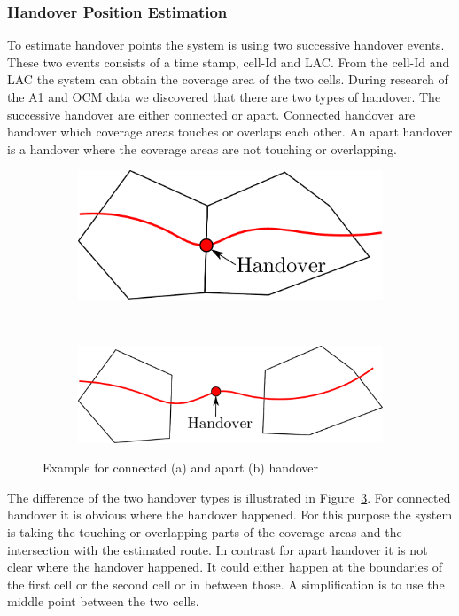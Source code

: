 \subsubsection{Handover Position Estimation}
To estimate handover points the system is using two successive handover events. These two events consists of a time stamp, cell-Id and LAC. From the cell-Id and LAC the system can obtain the coverage area of the two cells. During research of the A1 and OCM data we discovered that there are two types of handover. The successive handover are either connected or apart. Connected handover are handover which coverage areas touches or overlaps each other. An apart handover is a handover where the coverage areas are not touching or overlapping.
\begin{figure}
	\centering
	\begin{subfigure}[b]{0.4\textwidth}
		\includegraphics[width=\textwidth]{./images/handover_together}
		\caption{}
		\label{fig:handovertogether}
	\end{subfigure}%
	~ %
	\begin{subfigure}[b]{0.55\textwidth}
		\includegraphics[width=\textwidth]{./images/handover_apart}
		\caption{}
		\label{fig:handoverapart}
	\end{subfigure}

	\caption{Example for connected (a) and apart (b) handover}
	\label{fig:handovertypes}
\end{figure}
The difference of the two handover types is illustrated in Figure~\ref{fig:handovertypes}. For connected handover it is obvious where the handover happened. For this purpose the system is taking the touching or overlapping parts of the coverage areas and the intersection with the estimated route. In contrast for apart handover it is not clear where the handover happened. It could either happen at the boundaries of the first cell or the second cell or in between those. A simplification is to use the middle point between the two cells.
